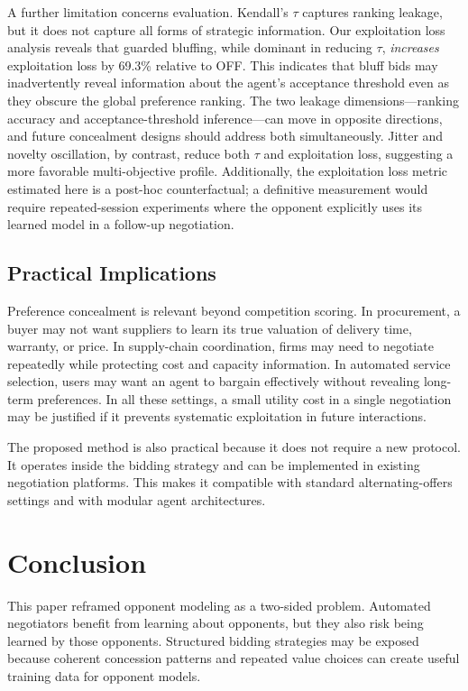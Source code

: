 \documentclass[runningheads]{llncs}
\begin{document}
A further limitation concerns evaluation. Kendall's $\tau$ captures ranking leakage, but it does not capture all forms of strategic information. Our exploitation loss analysis reveals that guarded bluffing, while dominant in reducing $\tau$, \emph{increases} exploitation loss by 69.3\% relative to OFF. This indicates that bluff bids may inadvertently reveal information about the agent's acceptance threshold even as they obscure the global preference ranking. The two leakage dimensions—ranking accuracy and acceptance-threshold inference—can move in opposite directions, and future concealment designs should address both simultaneously. Jitter and novelty oscillation, by contrast, reduce both $\tau$ and exploitation loss, suggesting a more favorable multi-objective profile. Additionally, the exploitation loss metric estimated here is a post-hoc counterfactual; a definitive measurement would require repeated-session experiments where the opponent explicitly uses its learned model in a follow-up negotiation.

\subsection{Practical Implications}

Preference concealment is relevant beyond competition scoring. In procurement, a buyer may not want suppliers to learn its true valuation of delivery time, warranty, or price. In supply-chain coordination, firms may need to negotiate repeatedly while protecting cost and capacity information. In automated service selection, users may want an agent to bargain effectively without revealing long-term preferences. In all these settings, a small utility cost in a single negotiation may be justified if it prevents systematic exploitation in future interactions.

The proposed method is also practical because it does not require a new protocol. It operates inside the bidding strategy and can be implemented in existing negotiation platforms. This makes it compatible with standard alternating-offers settings and with modular agent architectures.

\section{Conclusion}
\label{sec:conclusion}

This paper reframed opponent modeling as a two-sided problem. Automated negotiators benefit from learning about opponents, but they also risk being learned by those opponents. Structured bidding strategies may be exposed because coherent concession patterns and repeated value choices can create useful training data for opponent models.
\end{document}
